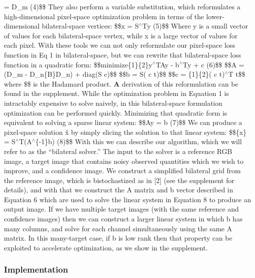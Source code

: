 = D\+\_\+m (4)\$\$ They also perform a variable substitution, which reformulates a high-\/dimensional pixel-\/space optimization problem in terms of the lower-\/dimensional bilateral-\/space vertices\+: \$\$x = S$^\wedge$\+Ty (5)\$\$ Where y is a small vector of values for each bilateral-\/space vertex, while x is a large vector of values for each pixel. With these tools we can not only reformulate our pixel-\/space loss function in Eq 1 in bilateral-\/space, but we can rewrite that bilateral-\/space loss function in a quadratic form\+: \$\$minimize\{1\}\{2\}y$^\wedge$\+T\+Ay -\/ b$^\wedge$\+Ty + c (6)\$\$ \$\$A = (D\+\_\+m -\/ D\+\_\+n\{B\}D\+\_\+n) + diag(S c)\$\$ \$\$b = S( c   t)\$\$ \$\$c = \{1\}\{2\}( c   t)$^\wedge$T t\$\$ where \$\$ is the Hadamard product. {\bfseries A} derivation of this reformulation can be found in the supplement. While the optimization problem in Equation 1 is intractably expensive to solve naively, in this bilateral-\/space formulation optimization can be performed quickly. Minimizing that quadratic form is equivalent to solving a sparse linear system\+: \$\$\+Ay = b (7)\$\$ We can produce a pixel-\/space solution x̂ by simply slicing the solution to that linear system\+: \$\$\{x\} = S$^\wedge$T(A$^\wedge$\{-\/1\}b)  (8)\$\$ With this we can describe our algorithm, which we will refer to as the “bilateral solver.\+” The input to the solver is a reference R\+GB image, a target image that contains noisy observed quantities which we wish to improve, and a confidence image. We construct a simplified bilateral grid from the reference image, which is bistochastized as in \mbox{[}2\mbox{]} (see the supplement for details), and with that we construct the A matrix and b vector described in Equation 6 which are used to solve the linear system in Equation 8 to produce an output image. If we have multiple target images (with the same reference and confidence images) then we can construct a larger linear system in which b has many columns, and solve for each channel simultaneously using the same A matrix. In this many-\/target case, if b is low rank then that property can be exploited to accelerate optimization, as we show in the supplement.

\subsubsection*{Implementation}


